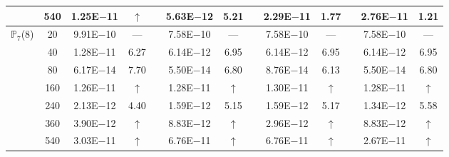 \begin{table}[H]
{\begin{tabular}{@{}l c c c c c c c c c c c c@{}}
 & 540 & 1.25E$-$11 & $\uparrow$  &  & 5.63E$-$12 & 5.21 &  & 2.29E$-$11 & 1.77 &  & 2.76E$-$11 & 1.21\\
\midrule
\multirow{7}{*}{$\mathbb{P}_{7}$(8)}
 & 20 & 9.91E$-$10 & ---  &  & 7.58E$-$10 & --- &  & 7.58E$-$10 & --- &  & 7.58E$-$10 & ---\\
 & 40 & 1.28E$-$11 & 6.27  &  & 6.14E$-$12 & 6.95 &  & 6.14E$-$12 & 6.95 &  & 6.14E$-$12 & 6.95\\
 & 80 & 6.17E$-$14 & 7.70  &  & 5.50E$-$14 & 6.80 &  & 8.76E$-$14 & 6.13 &  & 5.50E$-$14 & 6.80\\
 & 160 & 1.26E$-$11 & $\uparrow$  &  & 1.28E$-$11 & $\uparrow$ &  & 1.30E$-$11 & $\uparrow$ &  & 1.28E$-$11 & $\uparrow$\\
 & 240 & 2.13E$-$12 & 4.40  &  & 1.59E$-$12 & 5.15 &  & 1.59E$-$12 & 5.17 &  & 1.34E$-$12 & 5.58\\
 & 360 & 3.90E$-$12 & $\uparrow$  &  & 8.83E$-$12 & $\uparrow$ &  & 2.96E$-$12 & $\uparrow$ &  & 8.83E$-$12 & $\uparrow$\\
 & 540 & 3.03E$-$11 & $\uparrow$  &  & 6.76E$-$11 & $\uparrow$ &  & 6.76E$-$11 & $\uparrow$ &  & 2.67E$-$11 & $\uparrow$\\
\bottomrule
\end{tabular}}
\label{PRO:bending:01_01_glob2v2}
\end{table}
